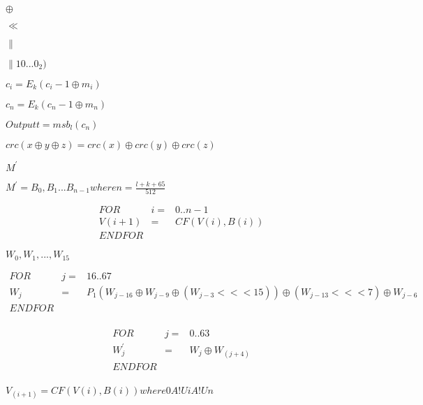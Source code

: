 \documentclass{article}
\begin{document}
$ \oplus$
\pagebreak

$ \ll $
\pagebreak

$ \parallel $
\pagebreak

$ \parallel 10...0_2) $
\pagebreak

$ c_i = E_k(c_i−1 \oplus m_i) $
\pagebreak

$ c_n = E_k(c_n−1 \oplus m_n) $
\pagebreak

$ Output t = msb_l(c_n) $
\pagebreak

$ crc(x \oplus y \oplus z) = crc(x) \oplus crc(y) \oplus crc(z) $
\pagebreak

$ {M}^{'}$
\pagebreak

$ {M}^{'} = B_0, B_1 ... B_{n-1} where n=\frac{l+k+65}{512}$
\pagebreak

\begin{eqnarray*}
 FOR&i=&0..n-1 \\
 V(i+1) &=& CF(V(i),B(i)) \\
 ENDFOR
 \end{eqnarray*}
\pagebreak

$ W_0, W_1, ... , W_15$
\pagebreak

\begin{eqnarray*}
 FOR&j=&16..67 \\
 W_j &=& P_1(W_{j-16} \oplus W_{j-9} \oplus (W_{j-3} <<< 15)) \oplus (W_{j-13} <<< 7) \oplus W_{j-6} \\
 ENDFOR \\
 \end{eqnarray*}
\pagebreak

\begin{eqnarray*}
 FOR&j=&0..63 \\
 {W}^{'}_j &=& W_j \oplus W_(j+4) \\
 ENDFOR \\
 \end{eqnarray*}
\pagebreak

$ V_(i+1) = CF(V(i),B(i)) where 0 A!U i A!U n $
\pagebreak
\end{document}
